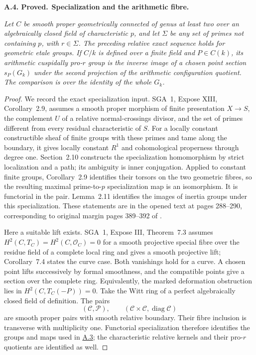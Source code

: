 \documentclass[11pt,a4paper]{article}
\newenvironment{claim}[3]{\par\medskip\noindent\hypertarget{#1}{\textbf{#1. #2.}}\ \textbf{#3.}\par\nopagebreak\smallskip\begingroup\itshape}{\endgroup\par\smallskip}
\newcommand{\statementref}[1]{\hyperlink{#1}{#1}}
\begin{document}
\begin{claim}{A.4}{Proved}{Specialization and the arithmetic fibre}
Let $C$ be smooth proper geometrically connected of genus at least two
over an algebraically closed field of characteristic $p$, and let
$\Sigma$ be any set of primes not containing $p$, with $r\in\Sigma$.
The preceding relative exact sequence holds for geometric etale groups.
If $C/k$ is defined over a finite field and $P\in C(k)$, its arithmetic
cuspidally pro-$r$ group is the inverse image of a chosen point section
$s_P(G_k)$ under the second projection of the arithmetic configuration
quotient. The comparison is over the identity of the whole $G_k$.
\end{claim}
\begin{proof}
We record the exact specialization input. SGA~1, Expose XIII,
Corollary~2.9, assumes a smooth proper morphism of finite presentation
$X\to S$, the complement $U$ of a relative normal-crossings divisor,
and the set of primes different from every residual characteristic of
$S$. For a locally constant constructible sheaf of finite groups with
these primes and tame along the boundary, it gives locally constant
$R^1$ and cohomological properness through degree one. Section~2.10
constructs the specialization homomorphism by strict localization and
a path; its ambiguity is inner conjugation. Applied to constant finite
groups, Corollary~2.9 identifies their torsors on the two geometric
fibres, so the resulting maximal prime-to-$p$ specialization map is an
isomorphism. It is functorial in the pair. Lemma~2.11 identifies the
images of inertia groups under this specialization. These statements
are in the opened text at pages 288--290, corresponding to original
margin pages 389--392 of \cite{LA_SGA1}.

Here a suitable lift exists. SGA~1, Expose III, Theorem~7.3 assumes
$H^2(C,T_C)=H^2(C,\mathcal O_C)=0$ for a smooth projective special
fibre over the residue field of a complete local ring and gives a
smooth projective lift; Corollary~7.4 states the curve case. Both
vanishings hold for a curve. A chosen point lifts successively by
formal smoothness, and the compatible points give a section over the
complete ring. Equivalently, the marked deformation obstruction lies
in $H^2(C,T_C(-P))=0$. Take the Witt ring of a perfect algebraically
closed field of definition. The pairs
\[
 (\mathcal C,\mathcal P),\qquad
 (\mathcal C\times\mathcal C,\operatorname{diag}\mathcal C)
\]
are smooth proper pairs with smooth relative boundary. Their fibre
inclusion is transverse with multiplicity one. Functorial
specialization therefore identifies the groups and maps used in
\statementref{A.3}; the characteristic relative kernels and their
pro-$r$ quotients are identified as well.


\end{proof}
\end{document}

